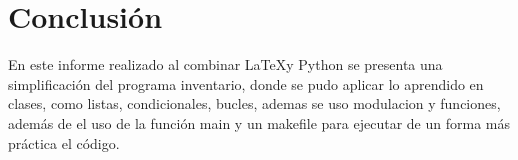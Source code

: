 \documentclass[12pt]{article}
\begin{document}
\section{Conclusión}

En este informe realizado al combinar \LaTeX y Python se presenta una simplificación del programa inventario, donde se pudo aplicar lo aprendido en clases, como listas, condicionales, bucles, ademas se uso modulacion y funciones, además de el uso de la función main y un makefile para ejecutar de un forma más práctica el código.
\end{document}
